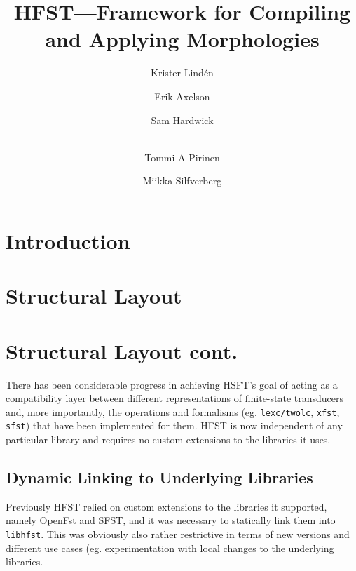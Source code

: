 \documentclass{llncs}
\begin{document}
%
\title{HFST---Framework for Compiling and Applying Morphologies}
%
\author{Krister Lind\'{e}n \and Erik Axelson \and Sam Hardwick \and\\
Tommi A Pirinen \and Miikka Silfverberg}


\maketitle


%
\begin{abstract}
\end{abstract}

\section*{Introduction}


\section{Structural Layout}


\section{Structural Layout cont.}
There has been considerable progress in achieving HSFT's goal of acting as a
compatibility layer between different representations of finite-state
transducers and, more importantly, the operations and formalisms (eg.
\verb+lexc/twolc+, \verb+xfst+, \verb+sfst+) that have been implemented
for them. HFST is now independent of any particular library and requires no
custom extensions to the libraries it uses.

\subsection{Dynamic Linking to Underlying Libraries}
Previously HFST relied on custom extensions to the libraries it supported,
namely OpenFst and SFST, and it was necessary to statically link them into
\verb+libhfst+. This was obviously also rather restrictive in terms of
new versions and different use cases (eg. experimentation with local changes to
the underlying libraries.
\end{document}
